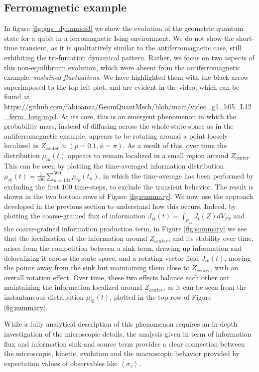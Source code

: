 \documentclass[%
 reprint,
 superscriptaddress,
 aps,
 pra,
]{revtex4-2}
\newcommand{\CC}[2]{\mathcal{C}_{#1 #2}}
\newcommand{\MV}[1]{\left\langle #1 \right\rangle}
\theoremstyle{definition}
\begin{document}
\subsection*{Ferromagnetic example}
In figure \ref{fig:gqs_dynamics3} we show the evolution of the geometric
quantum state for a qubit in a ferromagnetic Ising environment. We do not
show the short-time transient, as it is qualitatively similar to the antiferromagnetic case,
still exhibiting the tri-furcation dynamical pattern. Rather, we focus on two aspects
of this non-equilibrium evolution, which were absent from the antiferromagnetic example: \emph{sustained 
fluctuations}. We have highlighted them with the black arrow superimposed to the top left
plot, and are evident in the video, which can be found at
\url{https://github.com/fabioanza/GeomQuantMech/blob/main/video_g1_h05_L12_ferro_long.mp4}.
At its core, this is an emergent phenomenon in which the probability mass, instead of
diffusing across the whole state space as in the antiferromagnetic example, appears to be 
rotating around a point loosely localized as $Z_{\mathrm{center}} \approx (p=0.1,\phi=\pi)$. 
As a result of this, over time the distribution $\mu_{ik}(t)$ appears to remain localized in 
a small region around $Z_{\mathrm{center}}$. This can be seen by plotting the time-averaged
information distribution $\overline{\mu_{ik}(t)} = \frac{1}{400}\sum_{n=101}^{500} \mu_{ik}(t_n)$, 
in which the time-average has been performed by excluding the first $100$ time-steps, to 
exclude the transient behavior. The result is shown in the two bottom rows of Figure \ref{fig:summary}.  We now 
use the approach developed in the previous section to understand how this occurs. 
Indeed, by plotting the coarse-grained flux of information $J_{ik}(t) = \int_{\CC{i}{k}}J_t(Z) dV_{FS}$
and the coarse-grained information production term, in Figure \ref{fig:summary} we see that 
the localization of the information around $Z_{center}$, and its stability over time, arises 
from the competition between a sink term, drawing up information and delocalizing it across
the state space, and a rotating vector field $J_{ik}(t)$, moving the points away from the sink 
but maintaining them close to $Z_{center}$, with an overall rotation effect. Over time, these two
effects balance each other out maintaining the information localized around $Z_{center}$, 
as it can be seen from the instantaneous distribution $\mu_{ik}(t)$, plotted in the top
row of Figure \ref{fig:summary}.

While a fully analytical description of this phenomenon requires an in-depth investigation of the 
microscopic details, the analysis given in term of information flux and information sink and source
term provides a clear connection between the microscopic, kinetic, evolution and the macroscopic
behavior provided by expectation values of observables like $\MV{\sigma_z}$.
\end{document}
